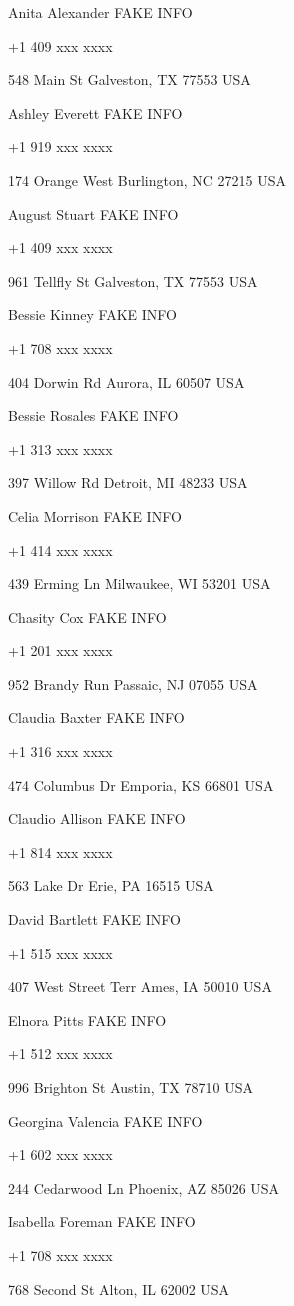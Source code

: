 \documentclass[]{book}
\theoremstyle{definition}
\theoremstyle{definition}
\theoremstyle{definition}
\theoremstyle{remark}
\begin{document}
Anita Alexander FAKE INFO

+1 409 xxx xxxx

548 Main St Galveston, TX 77553 USA

Ashley Everett FAKE INFO

+1 919 xxx xxxx

174 Orange West Burlington, NC 27215 USA

August Stuart FAKE INFO

+1 409 xxx xxxx

961 Tellfly St Galveston, TX 77553 USA

Bessie Kinney FAKE INFO

+1 708 xxx xxxx

404 Dorwin Rd Aurora, IL 60507 USA

Bessie Rosales FAKE INFO

+1 313 xxx xxxx

397 Willow Rd Detroit, MI 48233 USA

Celia Morrison FAKE INFO

+1 414 xxx xxxx

439 Erming Ln Milwaukee, WI 53201 USA

Chasity Cox FAKE INFO

+1 201 xxx xxxx

952 Brandy Run Passaic, NJ 07055 USA

Claudia Baxter FAKE INFO

+1 316 xxx xxxx

474 Columbus Dr Emporia, KS 66801 USA

Claudio Allison FAKE INFO

+1 814 xxx xxxx

563 Lake Dr Erie, PA 16515 USA

David Bartlett FAKE INFO

+1 515 xxx xxxx

407 West Street Terr Ames, IA 50010 USA

Elnora Pitts FAKE INFO

+1 512 xxx xxxx

996 Brighton St Austin, TX 78710 USA

Georgina Valencia FAKE INFO

+1 602 xxx xxxx

244 Cedarwood Ln Phoenix, AZ 85026 USA

Isabella Foreman FAKE INFO

+1 708 xxx xxxx

768 Second St Alton, IL 62002 USA
\end{document}
